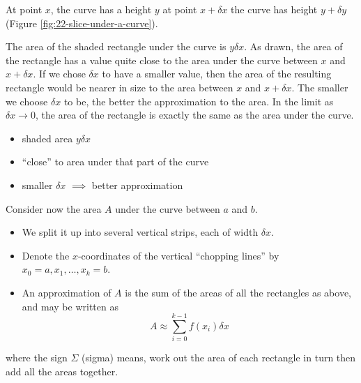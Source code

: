 \documentclass[
  english,
  11pt,
  oneside]{book}
\providecommand{\tightlist}{%
  \setlength{\itemsep}{0pt}\setlength{\parskip}{0pt}}
\newcommand{\slide}{}
\theoremstyle{definition}
\theoremstyle{definition}
\theoremstyle{definition}
\theoremstyle{definition}
\theoremstyle{remark}
\begin{document}
At point \(x\), the curve has a height \(y\) at point \(x + \delta x\) the curve has height \(y + \delta y\) (Figure \ref{fig:22-slice-under-a-curve}).

\begin{notslides}

The area of the shaded rectangle under the curve is \(y\delta x\). As drawn, the area of the rectangle has a value quite close to the area under the curve between \(x\) and \(x + \delta x\). If we chose \(\delta x\) to have a smaller value, then the area of the resulting rectangle would be nearer in size to the area between \(x\) and \(x + \delta x\). The smaller we choose \(\delta x\) to be, the better the approximation to the area. In the limit as \(\delta x \to 0\), the area of the rectangle is exactly the same as the area under the curve.

\end{notslides}

\begin{slidesonly}

\vfill

\begin{itemize}
\tightlist
\item
  shaded area \(y\delta x\)
\item
  ``close'' to area under that part of the curve
\item
  smaller \(\delta x\) \(\implies\) better approximation
\end{itemize}

\vfill
\slide

\end{slidesonly}

Consider now the area \(A\) under the curve between \(a\) and \(b\).

\begin{itemize}
\tightlist
\item
  We split it up into several vertical strips, each of width \(\delta x\).
\item
  Denote the \(x\)-coordinates of the vertical ``chopping lines'' by \(x_0=a, x_1, \dots, x_k=b\).
\item
  An approximation of \(A\) is the sum of the areas of all the rectangles as above, and may be written as
  \[
  A\approx\sum_{i=0}^{k-1}f(x_i)\delta x
  \]
\end{itemize}

\begin{notslides}

where the sign \(\Sigma\) (sigma) means, work out the area of each rectangle in turn then add all the areas together.

\end{notslides}
\end{document}
